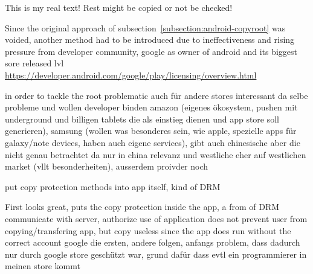 This is my real text! Rest might be copied or not be checked!

Since the original approach of subsection~\ref{subsection:android-copyroot} was voided, another method had to be introduced due to ineffectiveness and rising pressure from developer community, google as owner of android and its biggest sore released lvl \url{https://developer.android.com/google/play/licensing/overview.html}

in order to tackle the root problematic
auch für andere stores interessant da selbe probleme und wollen developer binden
amazon (eigenes ökosystem, pushen mit underground und billigen tablets die als einstieg dienen und app store soll generieren), samsung (wollen was besonderes sein, wie apple, spezielle apps für galaxy/note devices, haben auch eigene services), gibt auch chinesische aber die nicht genau betrachtet da nur in china relevanz und westliche eher auf westlichen market (vllt besonderheiten), ausserdem proivder noch
\cite{munteanLicense}


put copy protection methods into app itself, kind of DRM


First looks great, puts the copy protection inside the app, a from of DRM\newline
communicate with server, authorize use of application\newline
does not prevent user from copying/transfering app, but copy useless since the app does run without the correct account\newline
google die ersten, andere folgen, anfangs problem, dass dadurch nur durch google store geschützt war, grund dafür dass evtl ein programmierer in meinen store kommt\newline
